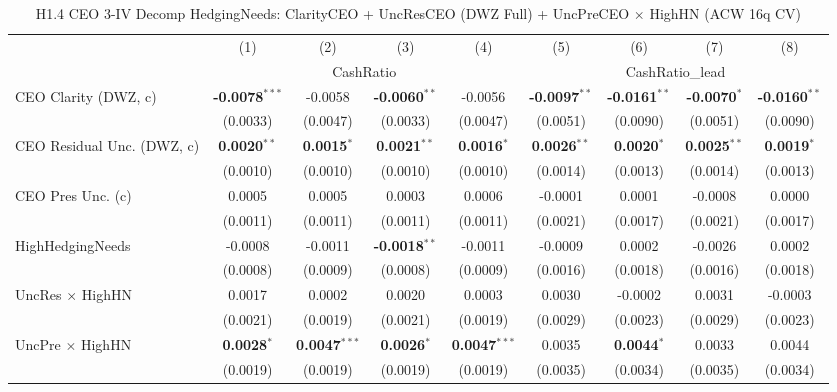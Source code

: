 \begin{landscape}
\begin{table}[H]
\setlength{\tabcolsep}{3pt}
\renewcommand{\arraystretch}{0.85}
\centering
\caption{H1.4 CEO 3-IV Decomp HedgingNeeds: ClarityCEO + UncResCEO (DWZ Full) + UncPreCEO $\times$ HighHN (ACW 16q CV)}
\label{tab:h1_4_hedging_needs}
\scriptsize
\begin{tabular}{lcccccccc}
\toprule
 & (1) & (2) & (3) & (4) & (5) & (6) & (7) & (8) \\
 & \multicolumn{4}{c}{CashRatio} & \multicolumn{4}{c}{CashRatio\_lead} \\
\cmidrule(lr){2-5} \cmidrule(lr){6-9}
\midrule
CEO Clarity (DWZ, c) & \textbf{-0.0078}$^{***}$ & -0.0058 & \textbf{-0.0060}$^{**}$ & -0.0056 & \textbf{-0.0097}$^{**}$ & \textbf{-0.0161}$^{**}$ & \textbf{-0.0070}$^{*}$ & \textbf{-0.0160}$^{**}$ \\
 & (0.0033) & (0.0047) & (0.0033) & (0.0047) & (0.0051) & (0.0090) & (0.0051) & (0.0090) \\
CEO Residual Unc. (DWZ, c) & \textbf{0.0020}$^{**}$ & \textbf{0.0015}$^{*}$ & \textbf{0.0021}$^{**}$ & \textbf{0.0016}$^{*}$ & \textbf{0.0026}$^{**}$ & \textbf{0.0020}$^{*}$ & \textbf{0.0025}$^{**}$ & \textbf{0.0019}$^{*}$ \\
 & (0.0010) & (0.0010) & (0.0010) & (0.0010) & (0.0014) & (0.0013) & (0.0014) & (0.0013) \\
CEO Pres Unc. (c) & 0.0005 & 0.0005 & 0.0003 & 0.0006 & -0.0001 & 0.0001 & -0.0008 & 0.0000 \\
 & (0.0011) & (0.0011) & (0.0011) & (0.0011) & (0.0021) & (0.0017) & (0.0021) & (0.0017) \\
HighHedgingNeeds & -0.0008 & -0.0011 & \textbf{-0.0018}$^{**}$ & -0.0011 & -0.0009 & 0.0002 & -0.0026 & 0.0002 \\
 & (0.0008) & (0.0009) & (0.0008) & (0.0009) & (0.0016) & (0.0018) & (0.0016) & (0.0018) \\
UncRes $\times$ HighHN & 0.0017 & 0.0002 & 0.0020 & 0.0003 & 0.0030 & -0.0002 & 0.0031 & -0.0003 \\
 & (0.0021) & (0.0019) & (0.0021) & (0.0019) & (0.0029) & (0.0023) & (0.0029) & (0.0023) \\
UncPre $\times$ HighHN & \textbf{0.0028}$^{*}$ & \textbf{0.0047}$^{***}$ & \textbf{0.0026}$^{*}$ & \textbf{0.0047}$^{***}$ & 0.0035 & \textbf{0.0044}$^{*}$ & 0.0033 & 0.0044 \\
 & (0.0019) & (0.0019) & (0.0019) & (0.0019) & (0.0035) & (0.0034) & (0.0035) & (0.0034) \\

\end{tabular}
\end{table}
\end{landscape}
